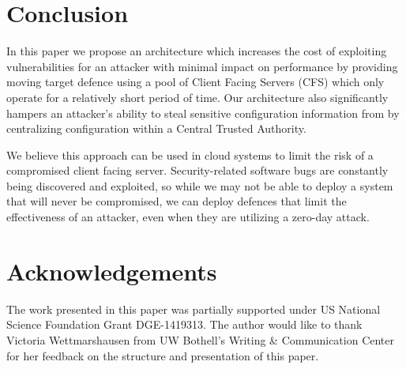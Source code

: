 \documentclass[a4paper,twoside]{article}
\begin{document}
\section{Conclusion}

In this paper we propose an architecture which increases the cost of exploiting vulnerabilities  for an attacker with minimal impact on performance by providing moving target defence using a pool of Client Facing Servers (CFS) which only operate for a relatively short period of time. Our architecture also significantly hampers an attacker's ability to steal sensitive configuration information from by centralizing configuration within a Central Trusted Authority.

We believe this approach can be used in cloud systems to limit the risk of a compromised client facing server.  Security-related software bugs are constantly being discovered and exploited, so while we may not be able to deploy a system that will never be compromised, we can deploy defences that limit the effectiveness of an attacker, even when they are utilizing a zero-day attack.

\section*{Acknowledgements}

The work presented in this paper was partially supported under US National Science Foundation Grant DGE-1419313. The author would like to thank Victoria Wettmarshausen from UW Bothell's Writing \& Communication Center for her feedback on the structure and presentation of this paper.





%
%
\end{document}
